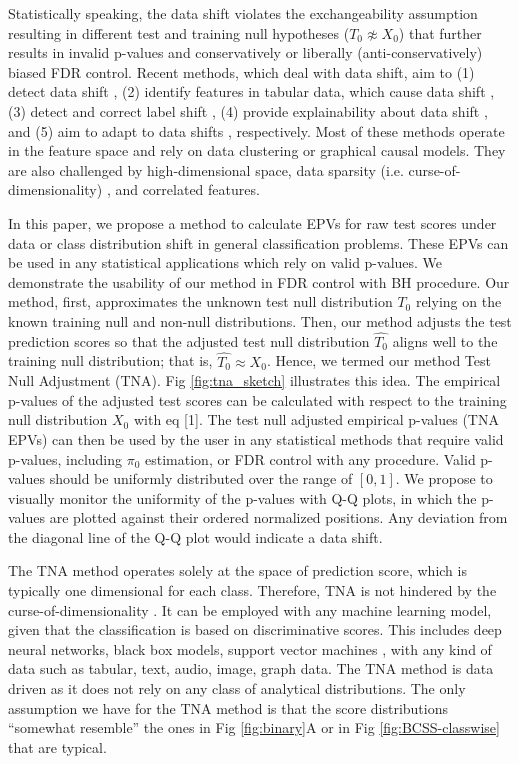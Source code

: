 \documentclass[10pt,letterpaper]{article}
\begin{document}
Statistically speaking, the data shift violates the exchangeability assumption resulting in different test and training null hypotheses ($T_0 \not\approx X_0$) that further results in invalid p-values and conservatively or liberally (anti-conservatively) biased FDR control. 
Recent methods, which deal with data shift, aim to (1) detect data shift  \cite{ dasu2009change}, (2) identify features in tabular data, which cause data shift \cite{kulinski2020feature}, (3) detect and correct label shift \cite{lipton2018detecting}, (4) provide explainability about data shift \cite{budhathoki2021did,kulinski2023towards}, and (5) aim to adapt to data shifts \cite{sui2024unleashing, zhang2021adaptive, zhang2022memo}, respectively.
Most of these methods operate in the feature space and rely on data clustering or graphical causal models.
They are also challenged by high-dimensional space, data sparsity (i.e. curse-of-dimensionality) \cite{donoho2000high}, and correlated features. 


In this paper, we propose a method to calculate EPVs for raw test scores under data or class distribution shift in general classification problems.
These EPVs can be used in any statistical applications which rely on valid p-values.
We demonstrate the usability of our method in FDR control with BH procedure.
Our method, first, approximates the unknown test null distribution $T_0$ relying on the known training null and non-null distributions.
Then, our method adjusts the test prediction scores so that the adjusted test null distribution $\hat{T_0}$ aligns well to the training null distribution; that is, $\hat{T_0}\approx X_0$.
Hence, we termed our method Test Null Adjustment (TNA).
Fig \ref{fig:tna_sketch} illustrates this idea.
The empirical p-values of the adjusted test scores can be calculated with respect to the training null distribution $X_0$ with eq [1].
The test null adjusted empirical p-values (TNA EPVs) can then be used by the user in any statistical methods that require valid p-values, including $\pi_0$ estimation, or FDR control with any procedure.
Valid p-values should be uniformly distributed over the range of $[0,1]$.
We propose to visually monitor the uniformity of the p-values with Q-Q plots, in which the p-values are plotted against their ordered normalized positions.
Any deviation from the diagonal line of the Q-Q plot would indicate a data shift.

The TNA method operates solely at the space of prediction score, which is typically one dimensional for each class.
Therefore, TNA is not hindered by the curse-of-dimensionality \cite{donoho2000high}.
It can be employed with any machine learning model, given that the classification is based on discriminative scores.
This includes deep neural networks, black box models, support vector machines \cite{cristianini2000introduction}, with any kind of data such as tabular, text, audio, image, graph data.
The TNA method is data driven as it does not rely on any class of analytical distributions.
The only assumption we have for the TNA method is that the score distributions ``somewhat resemble'' the ones in Fig \ref{fig:binary}A or in Fig \ref{fig:BCSS-classwise} that are typical. 
\end{document}
